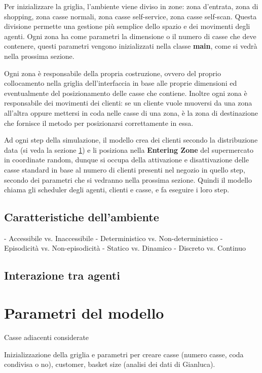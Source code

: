 Per inizializzare la griglia, l'ambiente viene diviso in zone: zona d'entrata, zona di shopping, zona casse normali, zona casse self-service, zona casse self-scan. Questa divisione permette una gestione più semplice dello spazio e dei movimenti degli agenti. Ogni zona ha come parametri la dimensione o il numero di casse che deve contenere, questi parametri vengono inizializzati nella classe \textbf{main}, come si vedrà nella prossima sezione.

Ogni zona è responsabile della propria costruzione, ovvero del proprio collocamento nella griglia dell'interfaccia in base alle proprie dimensioni ed eventualmente del posizionamento delle casse che contiene. Inoltre ogni zona è responsabile dei movimenti dei clienti: se un cliente vuole muoversi da una zona all'altra oppure mettersi in coda nelle casse di una zona, è la zona di destinazione che fornisce il metodo per posizionarsi correttamente in essa.

 Ad ogni step della simulazione, il modello crea dei clienti secondo la distribuzione data (si veda la sezione \ref{model:parameters}) e li posiziona nella \textbf{Entering Zone} del supermercato in coordinate random, dunque si occupa della attivazione e disattivazione delle casse standard in base al numero di clienti presenti nel negozio in quello step, secondo dei parametri che si vedranno nella prossima sezione. Quindi il modello chiama gli scheduler degli agenti, clienti e casse, e fa eseguire i loro step.

\subsection{Caratteristiche dell'ambiente}
- Accessibile vs. Inaccessibile
- Deterministico vs. Non-deterministico
- Episodicità vs. Non-episodicità
- Statico vs. Dinamico
- Discreto vs. Continuo

\subsection{Interazione tra agenti}

\section{Parametri del modello}
\label{model:parameters}

Casse adiacenti considerate

Inizializzazione della griglia e parametri per creare casse (numero casse, coda condivisa o no), customer, basket size (analisi dei dati di Gianluca).

